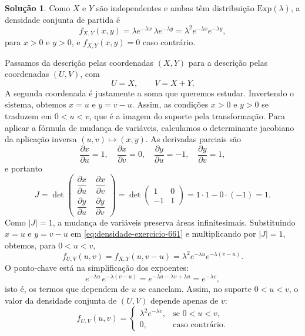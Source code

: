 \documentclass[12pt,portuguese]{article}
\theoremstyle{definition}
\theoremstyle{plainexercise}
\theoremstyle{starredexercise}
\theoremstyle{definition}
\newtheorem*{solution}{Solução}
\begin{document}
\begin{solution}
Como $X$ e $Y$ são independentes e ambas têm distribuição $\mathrm{Exp}(\lambda)$, a densidade
conjunta de partida é
\begin{equation}\label{eq:densidade-exercicio-661}
  f_{X,Y}(x,y) = \lambda e^{-\lambda x}\,\lambda e^{-\lambda y}
  = \lambda^2 e^{-\lambda x}e^{-\lambda y},
\end{equation}
para $x > 0$ e $y > 0$, e $f_{X,Y}(x,y) = 0$ caso contrário.

Passamos da descrição pelas coordenadas $(X,Y)$ para a descrição pelas coordenadas $(U,V)$,
com
\[
  U = X, \qquad V = X + Y.
\]
A segunda coordenada é justamente a soma que queremos estudar. Invertendo o sistema,
obtemos $x = u$ e $y = v - u$. Assim, as condições $x > 0$ e $y > 0$ se traduzem em
$0 < u < v$, que é a imagem do suporte pela transformação. Para aplicar a fórmula de mudança
de variáveis, calculamos o determinante jacobiano da aplicação inversa $(u,v) \mapsto (x,y)$.
As derivadas parciais são
\[
  \frac{\partial x}{\partial u} = 1, \quad
  \frac{\partial x}{\partial v} = 0, \quad
  \frac{\partial y}{\partial u} = -1, \quad
  \frac{\partial y}{\partial v} = 1,
\]
e portanto
\[
  J = \det
  \begin{pmatrix}
    \dfrac{\partial x}{\partial u} \ & \dfrac{\partial x}{\partial v} \\[0.5cm]
    \dfrac{\partial y}{\partial u} \ & \dfrac{\partial y}{\partial v}
  \end{pmatrix}
  = \det \begin{pmatrix} 1 & 0 \\ -1 & 1 \end{pmatrix}
  = 1 \cdot 1 - 0 \cdot (-1) = 1.
\]
Como $|J| = 1$, a mudança de variáveis preserva áreas infinitesimais. Substituindo $x = u$ e
$y = v-u$ em \eqref{eq:densidade-exercicio-661} e multiplicando por $|J| = 1$, obtemos, para
$0 < u < v$,
\[
  f_{U,V}(u,v) = f_{X,Y}(u, v-u) = \lambda^2 e^{-\lambda u}e^{-\lambda (v-u)}.
\]
O ponto-chave está na simplificação dos expoentes:
\[
  e^{-\lambda u}\,e^{-\lambda (v-u)} = e^{-\lambda u - \lambda v + \lambda u}
  = e^{-\lambda v},
\]
isto é, os termos que dependem de $u$ se cancelam. Assim, no suporte $0<u<v$,
o valor da densidade conjunta de $(U,V)$ depende apenas de $v$:
\begin{equation}\label{eq:conjunta-x-soma}
  f_{U,V}(u,v) =
  \begin{cases}
    \lambda^2 e^{-\lambda v}, & \text{se } 0 < u < v, \\[0.2cm]
    0, & \text{caso contrário}.
  \end{cases}
\end{equation}


\end{solution}
\end{document}
